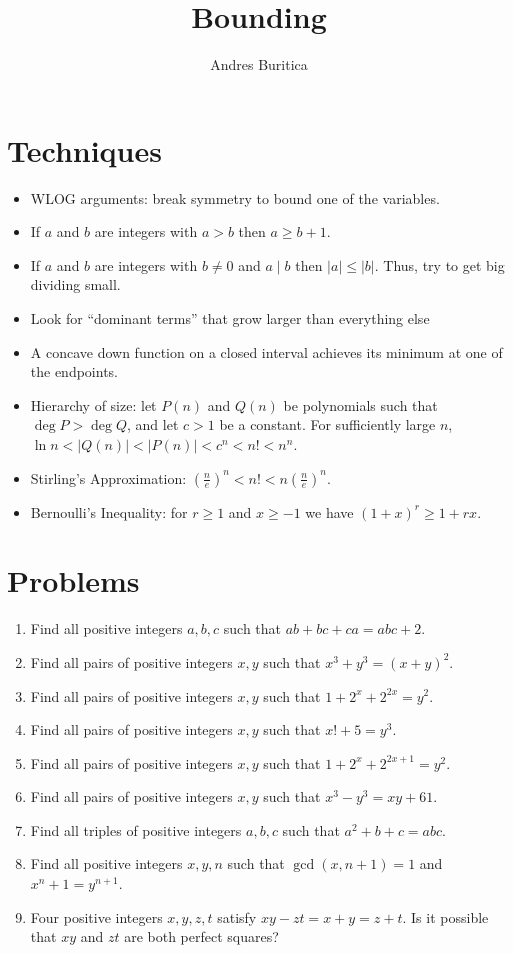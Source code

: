 \documentclass{article}
\title{Bounding}
\author{Andres Buritica}
\date{}
\begin{document}
\maketitle
\section{Techniques}
\begin{itemize}
  \item WLOG arguments: break symmetry to bound one of the variables.
  \item If $a$ and $b$ are integers with $a>b$ then $a\ge b+1$.
  \item If $a$ and $b$ are integers with $b\ne 0$ and $a\mid b$ then
    $|a|\le|b|$. Thus, try to get big dividing small.
  \item Look for ``dominant terms'' that grow larger than everything else
  \item A concave down function on a closed interval
    achieves its minimum at one of the endpoints.
  \item Hierarchy of size: let $P(n)$ and $Q(n)$ be polynomials such that $\deg
    P>\deg Q$, and let $c>1$ be a constant. For sufficiently large $n$,
    $\ln n<|Q(n)|<|P(n)|<c^n<n!<n^n$.
  \item Stirling's Approximation: $\left(\frac ne\right)^n<n!<n\left(\frac
    ne\right)^n$.
  \item Bernoulli's Inequality: for $r\ge 1$ and $x\ge -1$ we have $(1+x)^r\ge
    1+rx$.
\end{itemize}
\section{Problems}
\begin{enumerate}
  \item Find all positive integers $a,b,c$ such that $ab+bc+ca=abc+2$.
  \item Find all pairs of positive integers $x,y$ such that $x^3+y^3=(x+y)^2$.
  \item Find all pairs of positive integers $x,y$ such that
    $1+2^x+2^{2x}=y^2$.
  \item Find all pairs of positive integers $x,y$ such that $x!+5=y^3$.
  \item Find all pairs of positive integers $x,y$ such that
    $1+2^x+2^{2x+1}=y^2$.
  \item Find all pairs of positive integers $x,y$ such that $x^3-y^3=xy+61$.
  \item Find all triples of positive integers $a,b,c$ such that $a^2+b+c=abc$.
  \item Find all positive integers $x,y,n$ such that $\gcd(x,n+1)=1$ and
    $x^n+1=y^{n+1}$.
  \item Four positive integers $x,y,z,t$ satisfy $xy-zt=x+y=z+t$. Is it possible
    that $xy$ and $zt$ are both perfect squares?
\end{enumerate}
\newpage
\end{document}
